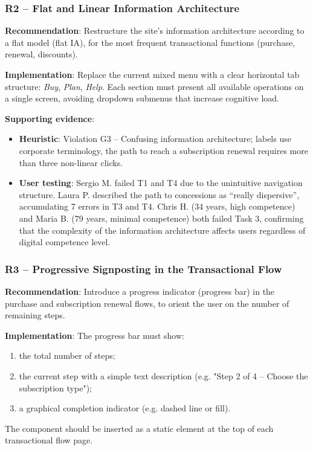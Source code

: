 ﻿\documentclass[11pt,a4paper]{article}
\begin{document}
\subsubsection{R2 -- Flat and Linear Information Architecture}
\label{rec:R2}

\textbf{Recommendation}: Restructure the site's information architecture
according to a flat model (flat IA), for the most frequent
transactional functions (purchase, renewal, discounts).

\textbf{Implementation}: Replace the current mixed menu with a
clear horizontal tab structure: \textit{Buy}, \textit{Plan},
\textit{Help}. Each section must present all
available operations on a single screen, avoiding dropdown submenus
that increase cognitive load.

\textbf{Supporting evidence}:
\begin{itemize}
    \item \textbf{Heuristic}: Violation G3 -- Confusing information
    architecture; labels use corporate terminology, the path to
    reach a subscription renewal requires more than three
    non-linear clicks.
    \item \textbf{User testing}: Sergio M. failed T1 and T4 due to
    the unintuitive navigation structure. Laura P. described
    the path to concessions as ``really dispersive'',
    accumulating 7 errors in T3 and T4. Chris H. (34 years, high
    competence) and Maria B. (79 years, minimal competence) both failed
    Task 3, confirming that the complexity of the information
    architecture affects users regardless of digital competence level.
\end{itemize}

\subsubsection{R3 -- Progressive Signposting in the Transactional Flow}
\label{rec:R3}

\textbf{Recommendation}: Introduce a progress indicator
(progress bar) in the purchase and subscription renewal flows,
to orient the user on the number of remaining steps.

\textbf{Implementation}: The progress bar must show:
\begin{enumerate}
    \item the total number of steps;
    \item the current step with a simple text description (e.g. "Step 2 of 4 -- Choose the subscription type");
    \item a graphical completion indicator (e.g. dashed line or
    fill).
\end{enumerate}
The component should be inserted as a static element at the top of each
transactional flow page.
\end{document}
